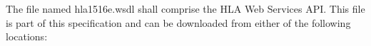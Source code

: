 
\clearpage

\begin{compactstdpage}

    The file named hla1516e.wsdl shall comprise the HLA Web Services API. This file is part of this specification and can be downloaded from either of the following locations:

    \begin{stddashlist}
        \item {}
        \item {}
    \end{stddashlist}
\end{compactstdpage}

\clearpage

\thispagestyle{body}
\null
